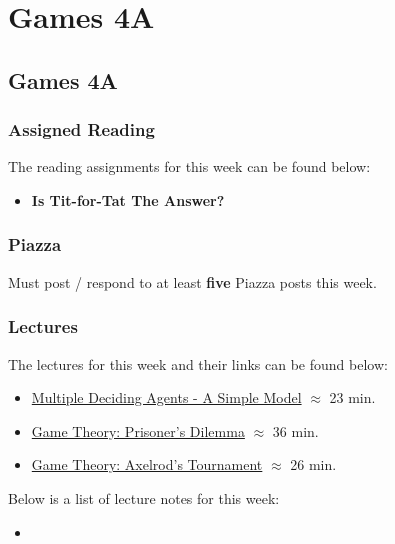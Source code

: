 \clearpage

\renewcommand{\ChapTitle}{Games 4A}
\renewcommand{\SectionTitle}{Games 4A}

\chapter{\ChapTitle}
\section{\SectionTitle}

\subsection{Assigned Reading}

The reading assignments for this week can be found below:

\begin{itemize}
    \item \textbf{Is Tit-for-Tat The Answer?}
\end{itemize}

\subsection{Piazza}

Must post / respond to at least \textbf{five} Piazza posts this week.

\subsection{Lectures}

The lectures for this week and their links can be found below:

\begin{itemize}
    \item \href{https://www.youtube.com/watch?v=JDg9Z2W9Mfk}{Multiple Deciding Agents - A Simple Model} $\approx$ 23 min.
    \item \href{https://www.youtube.com/watch?v=6rD16HNCs50}{Game Theory: Prisoner's Dilemma} $\approx$ 36 min.
    \item \href{https://www.youtube.com/watch?v=5D5huKHZgu0}{Game Theory: Axelrod's Tournament} $\approx$ 26 min.
\end{itemize}

\noindent Below is a list of lecture notes for this week:

\begin{itemize}
    \item {}
\end{itemize}

